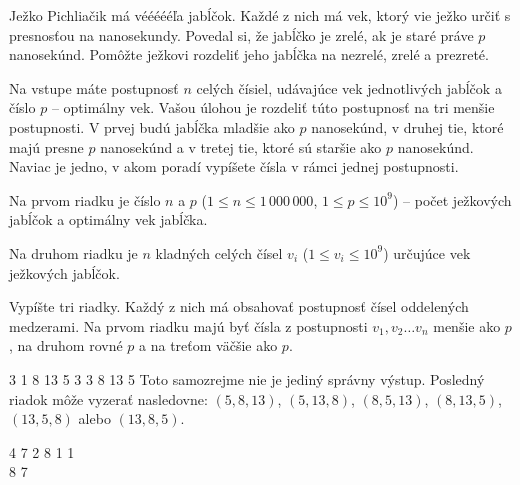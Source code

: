 




Ježko Pichliačik má véééééľa jabĺčok. Každé z nich má vek, ktorý vie ježko
určiť s presnosťou na nanosekundy. Povedal si, že jabĺčko je zrelé, ak je staré
práve $p$ nanosekúnd. Pomôžte ježkovi rozdeliť jeho jabĺčka na nezrelé, zrelé a
prezreté.


Na vstupe máte postupnosť $n$ celých čísiel, udávajúce vek jednotlivých jabĺčok
a číslo $p$ -- optimálny vek. Vašou úlohou je rozdeliť túto postupnosť na tri
menšie postupnosti. V prvej budú jabĺčka mladšie ako $p$ nanosekúnd, v druhej
tie, ktoré majú presne $p$ nanosekúnd a v tretej tie, ktoré sú staršie ako $p$
nanosekúnd. Naviac je jedno, v akom poradí vypíšete čísla v rámci jednej
postupnosti.


Na prvom riadku je číslo $n$ a $p$ ($1 \leq n \leq 1\,000\,000$, $1\leq p\leq
10^9$) -- počet ježkových jabĺčok a optimálny vek jabĺčka.

Na druhom riadku je $n$ kladných celých čísel $v_i$ ($1 \leq v_i \leq 10^9$)
určujúce vek ježkových jabĺčok.


Vypíšte tri riadky. Každý z nich má obsahovať postupnosť čísel oddelených
medzerami. Na prvom riadku majú byť čísla z postupnosti $v_1, v_2 \dots v_n$
menšie ako $p$, na druhom rovné $p$ a na treťom väčšie ako $p$.


 3
1 8 13 5 3
3
8 13 5
\komentar
Toto samozrejme nie je jediný správny výstup. Posledný riadok môže vyzerať
nasledovne: $(5, 8, 13)$, $(5, 13, 8)$, $(8, 5, 13)$, $(8, 13, 5)$, $(13, 5,
8)$ alebo $(13, 8, 5)$. 
\koniec

 4
7 2 8 1
 1\\
8 7
\koniec


